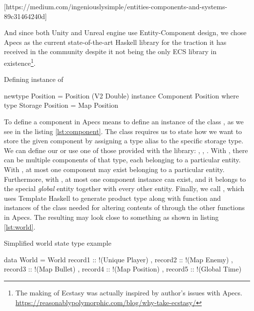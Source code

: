 \documentclass[
  digital, %
  color,   %
  table,   %
  oneside, %
  lof,     %
  lot,     %
]{fithesis3}
\begin{document}
[https://medium.com/ingeniouslysimple/entities-components-and-systems-89c31464240d]

And since both Unity and Unreal engine use Entity-Component design,
we chose Apecs as the current state-of-the-art Haskell library
for the traction it has received in the community despite
it not being the only ECS library in existence\footnote{
The making of Ecstasy was actually inspired by author's issues with Apecs. \\
\url{https://reasonablypolymorphic.com/blog/why-take-ecstasy/}
}.

\begin{listing}[H]
\caption{Defining instance of }
\begin{haskell}
newtype Position = Position (V2 Double)
instance Component Position where
    type Storage Position = Map Position
\end{haskell}
\label{lst:component}
\end{listing}

To define a component in Apecs means to define an instance of the class ,
as we see in the listing \ref{lst:component}.
The  class
requires us to state how we want to store the given component
by assigning a type alias to the specific storage type.
We can define our  or use one of those provided
with the library: , , .
With , there can be multiple components of that type,
each belonging to a particular entity.
With , at most one component may exist
belonging to a particular entity. Furthermore,
with , at most one component instance can exist,
and it belongs to the special \emph{global} entity together
with every other entity. Finally, we call ,
which uses Template Haskell to generate  product type
along with  function and instances of the 
class needed for altering contents of  through
the other functions in Apecs. The resulting 
may look close to something as shown in listing \ref{lst:world}.

\begin{listing}[H]
\caption{Simplified world state type example}
\begin{haskell}
data World =
    World
    { record1 :: !(Unique Player)
    , record2 :: !(Map Enemy)
    , record3 :: !(Map Bullet)
    , record4 :: !(Map Position)
    , record5 :: !(Global Time)
    }
\end{haskell}
\label{lst:world}
\end{listing}
\end{document}

